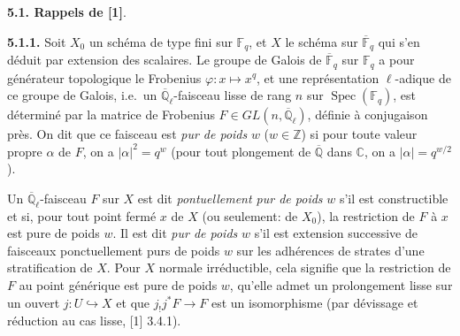 \documentclass[12pt,a4paper]{article}
\theoremstyle{plain}
\theoremstyle{definition}
\DeclareMathOperator{\Spec}{Spec}
\newcommand{\into}{\hookrightarrow}
\providecommand{\Spec}{\operatorname{Spec}}
\begin{document}
\noindent\textbf{5.1. Rappels de [1]}.

\noindent\textbf{5.1.1.} Soit $X_{0}$ un sch\'{e}ma de type fini sur $\mathbb{F}_{q}$, et $X$ le sch\'{e}ma sur $\overline{\mathbb{F}}_{q}$ qui s'en d\'{e}duit par extension des scalaires. Le groupe de Galois de $\overline{\mathbb{F}}_{q}$ sur $\mathbb{F}_{q}$ a pour g\'{e}n\'{e}rateur topologique le Frobenius $\varphi: x \mapsto x^{q}$, et une repr\'{e}sentation $\ell$-adique de ce groupe de Galois, i.e.\ un $\overline{\mathbb{Q}}_{\ell}$-faisceau lisse de rang $n$ sur $\Spec(\mathbb{F}_{q})$, est d\'{e}termin\'{e} par la matrice de Frobenius $F \in GL(n, \overline{\mathbb{Q}}_{\ell})$, d\'{e}finie \`{a} conjugaison pr\`{e}s. On dit que ce faisceau est \emph{pur de poids} $w$ ($w \in \mathbb{Z}$) si pour toute valeur propre $\alpha$ de $F$, on a $|\alpha|^{2} = q^{w}$ (pour tout plongement de $\overline{\mathbb{Q}}$ dans $\mathbb{C}$, on a $|\alpha| = q^{w/2}$).

Un $\overline{\mathbb{Q}}_{\ell}$-faisceau $F$ sur $X$ est dit \emph{pontuellement pur de poids} $w$ s'il est constructible et si, pour tout point ferm\'{e} $x$ de $X$ (ou seulement: de $X_{0}$), la restriction de $F$ \`{a} $x$ est pure de poids $w$. Il est dit \emph{pur de poids} $w$ s'il est extension successive de faisceaux ponctuellement purs de poids $w$ sur les adh\'{e}rences de strates d'une stratification de $X$. Pour $X$ normale irr\'{e}ductible, cela signifie que la restriction de $F$ au point g\'{e}n\'{e}rique est pure de poids $w$, qu'elle admet un prolongement lisse sur un ouvert $j: U \into X$ et que $j_{!}j^{*}F \to F$ est un isomorphisme (par d\'{e}vissage et r\'{e}duction au cas lisse, [1] 3.4.1).
\end{document}
